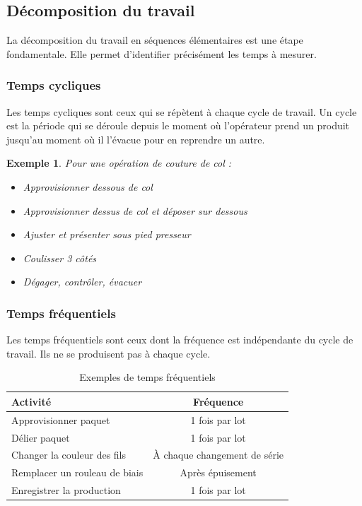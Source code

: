 \documentclass[a4paper,12pt]{article}
\newtheorem{exemple}{Exemple}[section]
\begin{document}
\subsection{Décomposition du travail}

La décomposition du travail en séquences élémentaires est une étape fondamentale. Elle permet d'identifier précisément les temps à mesurer.

\subsubsection{Temps cycliques}

Les temps cycliques sont ceux qui se répètent à chaque cycle de travail. Un cycle est la période qui se déroule depuis le moment où l'opérateur prend un produit jusqu'au moment où il l'évacue pour en reprendre un autre.

\begin{exemple}
Pour une opération de couture de col :
\begin{itemize}
    \item Approvisionner dessous de col
    \item Approvisionner dessus de col et déposer sur dessous
    \item Ajuster et présenter sous pied presseur
    \item Coulisser 3 côtés
    \item Dégager, contrôler, évacuer
\end{itemize}
\end{exemple}

\subsubsection{Temps fréquentiels}

Les temps fréquentiels sont ceux dont la fréquence est indépendante du cycle de travail. Ils ne se produisent pas à chaque cycle.

\begin{table}[ht]
\centering
\begin{tabular}{|l|c|}
\hline
\textbf{Activité} & \textbf{Fréquence} \\
\hline
Approvisionner paquet & 1 fois par lot \\
Délier paquet & 1 fois par lot \\
Changer la couleur des fils & À chaque changement de série \\
Remplacer un rouleau de biais & Après épuisement \\
Enregistrer la production & 1 fois par lot \\
\hline
\end{tabular}
\caption{Exemples de temps fréquentiels}
\end{table}
\end{document}
